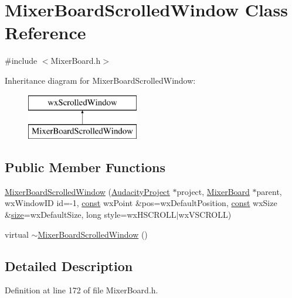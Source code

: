 \hypertarget{class_mixer_board_scrolled_window}{}\section{Mixer\+Board\+Scrolled\+Window Class Reference}
\label{class_mixer_board_scrolled_window}


{\ttfamily \#include $<$Mixer\+Board.\+h$>$}

Inheritance diagram for Mixer\+Board\+Scrolled\+Window\+:\begin{figure}[H]
\begin{center}
\leavevmode
\includegraphics[height=2.000000cm]{class_mixer_board_scrolled_window}
\end{center}
\end{figure}
\subsection*{Public Member Functions}
\begin{DoxyCompactItemize}
\item 
\hyperlink{class_mixer_board_scrolled_window_aaa81a24cc2ccffefc2374f813e3fdfc7}{Mixer\+Board\+Scrolled\+Window} (\hyperlink{class_audacity_project}{Audacity\+Project} $\ast$project, \hyperlink{class_mixer_board}{Mixer\+Board} $\ast$parent, wx\+Window\+ID id=-\/1, \hyperlink{getopt1_8c_a2c212835823e3c54a8ab6d95c652660e}{const} wx\+Point \&pos=wx\+Default\+Position, \hyperlink{getopt1_8c_a2c212835823e3c54a8ab6d95c652660e}{const} wx\+Size \&\hyperlink{group__lavu__mem_ga854352f53b148adc24983a58a1866d66}{size}=wx\+Default\+Size, long style=wx\+H\+S\+C\+R\+O\+LL$\vert$wx\+V\+S\+C\+R\+O\+LL)
\item 
virtual \hyperlink{class_mixer_board_scrolled_window_a6f3e326ed64536c710b3573a062afd77}{$\sim$\+Mixer\+Board\+Scrolled\+Window} ()
\end{DoxyCompactItemize}


\subsection{Detailed Description}


Definition at line 172 of file Mixer\+Board.\+h.



